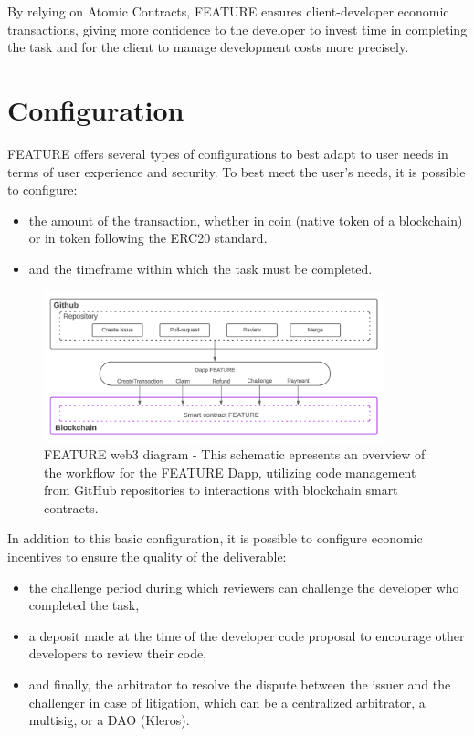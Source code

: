 \documentclass[
	a4paper, %
	10pt, %
	unnumberedsections, %
	twoside, %
]{LTJournalArticle}
\begin{document}
By relying on Atomic Contracts, FEATURE ensures client-developer economic transactions, giving more confidence to the developer to invest time in completing the task and for the client to manage development costs more precisely.


\section{Configuration}

FEATURE offers several types of configurations to best adapt to user needs in terms of user experience and security. To best meet the user's needs, it is possible to configure:

\begin{itemize}
\item
  the amount of the transaction, whether in coin (native token of a blockchain) or in token following the ERC20 standard.
\item
  and the timeframe within which the task must be completed.
\end{itemize}

\begin{figure}[ht]
  \centering
  \includegraphics[width=0.88\textwidth]{media/diagram_web3_Feature.png}
  \caption{FEATURE web3 diagram - This schematic epresents an overview of the workflow for the FEATURE Dapp, utilizing code management from GitHub repositories to interactions with blockchain smart contracts.}
  \label{fig:web3 diagram}
\end{figure}

In addition to this basic configuration, it is possible to configure economic incentives to ensure the quality of the deliverable:

\begin{itemize}
\item
  the challenge period during which reviewers can challenge the developer who completed the task,
\item
  a deposit made at the time of the developer code proposal to encourage other developers to review their code,
\item
  and finally, the arbitrator to resolve the dispute between the issuer and the challenger in case of litigation, which can be a centralized arbitrator, a multisig, or a DAO (Kleros).
\end{itemize}
\end{document}

